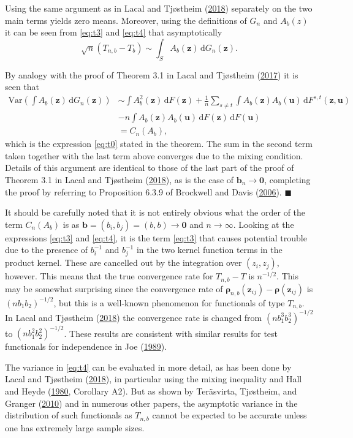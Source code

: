 \documentclass[
  12pt,
  letterpaper]{article}
\numberwithin{equation}{section}
\newcommand{\z}{\bm{z}}
\newcommand{\fu}{\bm{u}}
\newcommand{\frho}{\bm{\rho}}
\newcommand{\bb}{\bm{b}}
\newcommand{\Var}{\textrm{Var}}
\newcommand{\di}{\,\textrm{d}}
\begin{document}
Using the same argument as in Lacal and Tjøstheim (\protect\hyperlink{ref-lacal2018estimating}{2018}) separately on the two main terms yields zero means. Moreover, using the definitions of \(G_n\) and \(A_b(z)\) it can be seen from \eqref{eq:t3} and \eqref{eq:t4} that asymptotically
\[
\sqrt{n}\left(T_{n,b} - T_b\right) \sim \int_S A_b(\z) \di G_n(\z).
\]

By analogy with the proof of Theorem 3.1 in Lacal and Tjøstheim (\protect\hyperlink{ref-lacal2017local}{2017}) it is seen that
\begin{align*}
\Var\left(\int A_b(\z) \di G_n(\z)\right) &\sim \int A_b^2(\z) \di F(\z) + \frac{1}{n}\sum_{s \neq t} \int A_b(\z)A_b(\fu) \di F^{s,t}(\z,\fu) \\ 
& - n\int A_b(\z)A_b(\fu) \di F(\z)\di F(\fu) \\
& = C_n(A_b),
\end{align*}
which is the expression \eqref{eq:t0} stated in the theorem. The sum in the second term taken together with the last term above converges due to the mixing condition. Details of this argument are identical to those of the last part of the proof of Theorem 3.1 in Lacal and Tjøstheim (\protect\hyperlink{ref-lacal2018estimating}{2018}), as is the case of \(\bb_n \rightarrow \bm{0}\), completing the proof by referring to Proposition 6.3.9 of Brockwell and Davis (\protect\hyperlink{ref-brockwell1991time}{2006}). \(\blacksquare\)

It should be carefully noted that it is not entirely obvious what the order of the term \(C_n(A_b)\) is as \(\bb = (b_i,b_j) = (b,b) \to \bm{0}\) and \(n \to \infty\). Looking at the expressions \eqref{eq:t3} and \eqref{eq:t4}, it is the term \eqref{eq:t3} that causes potential trouble due to the presence of \(b_i^{-1}\) and \(b_j^{-1}\) in the two kernel function terms in the product kernel. These are cancelled out by the integration over \((z_i,z_j)\), however. This means that the true convergence rate for \(T_{n,b}-T\) is \(n^{-1/2}\). This may be somewhat surprising since the convergence rate of \(\frho_{n,b}(\z_{ij})-\frho(\z_{ij})\) is \((nb_1b_2)^{-1/2}\), but this is a well-known phenomenon for functionals of type \(T_{n,b}\). In Lacal and Tjøstheim (\protect\hyperlink{ref-lacal2018estimating}{2018}) the convergence rate is changed from \((nb_1^3b_2^3)^{-1/2}\) to \((nb_1^2b_2^2)^{-1/2}\). These results are consistent with similar results for test functionals for independence in Joe (\protect\hyperlink{ref-joe1989estimation}{1989}).

The variance in \eqref{eq:t4} can be evaluated in more detail, as has been done by Lacal and Tjøstheim (\protect\hyperlink{ref-lacal2018estimating}{2018}), in particular using the mixing inequality and Hall and Heyde (\protect\hyperlink{ref-hall1980martingale}{1980}, Corollary A2). But as shown by Teräsvirta, Tjøstheim, and Granger (\protect\hyperlink{ref-terasvirta2010modelling}{2010}) and in numerous other papers, the asymptotic variance in the distribution of such functionals as \(T_{n,b}\) cannot be expected to be accurate unless one has extremely large sample sizes.
\end{document}
